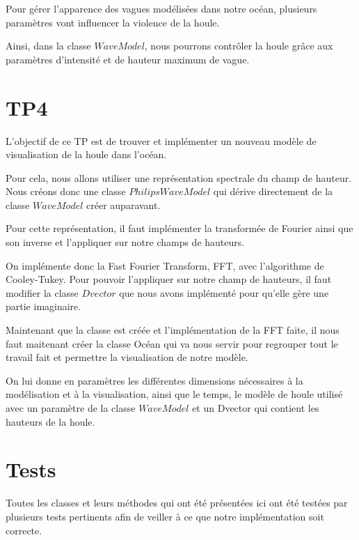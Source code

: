 \documentclass{article}
\begin{document}
\vspace{1cm}


Pour gérer l'apparence des vagues modélisées dans notre océan, plusieurs paramètres vont influencer la violence de la houle.

Ainsi, dans la classe $WaveModel$, nous pourrons contrôler la houle grâce aux paramètres d'intensité et de hauteur maximum de vague.

\vspace{1cm}

\section{TP4}

L'objectif de ce TP est de trouver et implémenter un nouveau modèle de visualisation de la houle dans l'océan.

Pour cela, nous allons utiliser une représentation spectrale du champ de hauteur. Nous créons donc une classe $PhilipsWaveModel$ qui dérive directement de la classe $WaveModel$ créer auparavant.

Pour cette représentation, il faut implémenter la transformée de Fourier ainsi que son inverse et l'appliquer sur notre champs de hauteurs.

On implémente donc la Fast Fourier Transform, FFT, avec l'algorithme de Cooley-Tukey. Pour pouvoir l'appliquer sur notre champ de hauteurs, il faut modifier la classe $Dvector$ que nous avons implémenté pour qu'elle gère une partie imaginaire.


Maintenant que la classe est créée et l'implémentation de la FFT faite, il nous faut maitenant créer la classe Océan qui va nous servir pour regrouper tout le travail fait et permettre la visualisation de notre modèle.

On lui donne en paramètres les différentes dimensions nécessaires à la modélisation et à la visualisation, ainsi que le temps, le modèle de houle utilisé avec un paramètre de la classe $WaveModel$ et un Dvector qui contient les hauteurs de la houle.

\vspace{1cm}

\section{Tests}

Toutes les classes et leurs méthodes qui ont été présentées ici ont été testées par plusieurs tests pertinents afin de veiller à ce que notre implémentation soit correcte.
\end{document}
